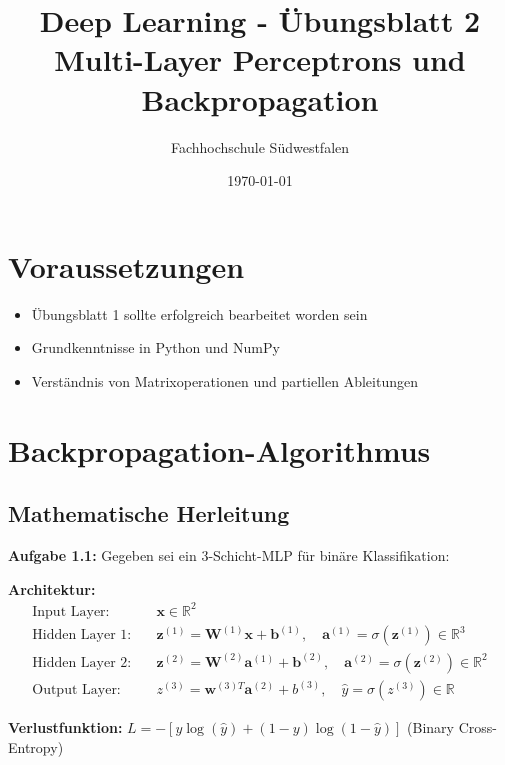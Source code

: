 ﻿\documentclass[12pt,a4paper]{article}
\title{\textbf{Deep Learning - Übungsblatt 2} \\ \large Multi-Layer Perceptrons und Backpropagation}
\author{Fachhochschule Südwestfalen}
\date{\today}
\begin{document}
\maketitle

\section*{Voraussetzungen}
\begin{itemize}
    \item Übungsblatt 1 sollte erfolgreich bearbeitet worden sein
    \item Grundkenntnisse in Python und NumPy
    \item Verständnis von Matrixoperationen und partiellen Ableitungen
\end{itemize}

\section{Backpropagation-Algorithmus }

\subsection{Mathematische Herleitung }

\textbf{Aufgabe 1.1:} Gegeben sei ein 3-Schicht-MLP für binäre Klassifikation:

\textbf{Architektur:}
\begin{align}
\text{Input Layer:} &\quad \mathbf{x} \in \mathbb{R}^2 \\
\text{Hidden Layer 1:} &\quad \mathbf{z}^{(1)} = \mathbf{W}^{(1)} \mathbf{x} + \mathbf{b}^{(1)}, \quad \mathbf{a}^{(1)} = \sigma(\mathbf{z}^{(1)}) \in \mathbb{R}^3 \\
\text{Hidden Layer 2:} &\quad \mathbf{z}^{(2)} = \mathbf{W}^{(2)} \mathbf{a}^{(1)} + \mathbf{b}^{(2)}, \quad \mathbf{a}^{(2)} = \sigma(\mathbf{z}^{(2)}) \in \mathbb{R}^2 \\
\text{Output Layer:} &\quad z^{(3)} = \mathbf{w}^{(3)T} \mathbf{a}^{(2)} + b^{(3)}, \quad \hat{y} = \sigma(z^{(3)}) \in \mathbb{R}
\end{align}

\textbf{Verlustfunktion:} $L = -[y \log(\hat{y}) + (1-y) \log(1-\hat{y})]$ (Binary Cross-Entropy)
\end{document}
